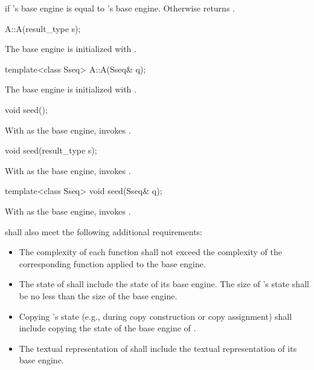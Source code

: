 \begin{itemdescr}
\pnum
\returns
  if 's base engine is equal to 's base engine.
 Otherwise returns .
\end{itemdescr}

\begin{itemdecl}
A::A(result_type s);
\end{itemdecl}

\begin{itemdescr}
\pnum
\effects
 The base engine is initialized
 with .
\end{itemdescr}

\begin{itemdecl}
template<class Sseq> A::A(Sseq& q);
\end{itemdecl}

\begin{itemdescr}
\pnum
\effects
 The base engine is initialized
 with .
\end{itemdescr}

\begin{itemdecl}
void seed();
\end{itemdecl}

\begin{itemdescr}
\pnum
\effects
 With  as the base engine, invokes .
\end{itemdescr}

\begin{itemdecl}
void seed(result_type s);
\end{itemdecl}

\begin{itemdescr}
\pnum
\effects
 With  as the base engine, invokes .
\end{itemdescr}

\begin{itemdecl}
template<class Sseq> void seed(Sseq& q);
\end{itemdecl}

\begin{itemdescr}
\pnum
\effects
 With  as the base engine, invokes .
\end{itemdescr}

\pnum
{} shall also meet
the following additional requirements:
\begin{itemize}
 \item
   The complexity
   of each function
   shall not exceed the complexity
   of the corresponding function
   applied to the base engine.
 \item
   The state
   of 
   shall include the state
   of its base engine.
   The size of 's state
   shall be no less than the size of the base engine.
 \item
   Copying 's state
   (e.g., during copy construction or copy assignment)
   shall include copying
   the state of the base engine of .
 \item
   The textual representation
   of 
   shall include
   the textual representation of its base engine.
\end{itemize}

